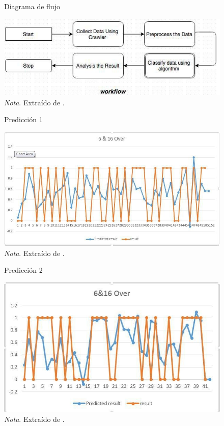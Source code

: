 \begin{figure}[ht]
\centering
\caption{Diagrama de flujo}
\includegraphics[width=\textwidth]{Figuras/fig-5.jpg}
\caption*{\textit{Nota}. \normalfont Extraído de \textcite{Bailey}.}
\label{fig:flujo_de_trabajo}
\end{figure}


\begin{figure}[ht]
\centering
\caption{Predicción 1}
\includegraphics[scale=0.8]{Figuras/fig-17.jpg}
\caption*{\textit{Nota}. \normalfont Extraído de \textcite{Bailey}.}
\label{fig:Predicción_1}
\end{figure}

\begin{figure}[ht]
\centering
\caption{Predicción 2}
\includegraphics[width=\textwidth]{Figuras/fig-18.jpg}
\caption*{\textit{Nota}. \normalfont Extraído de \textcite{Bailey}.}
\label{fig:Predicción_2}
\end{figure}


